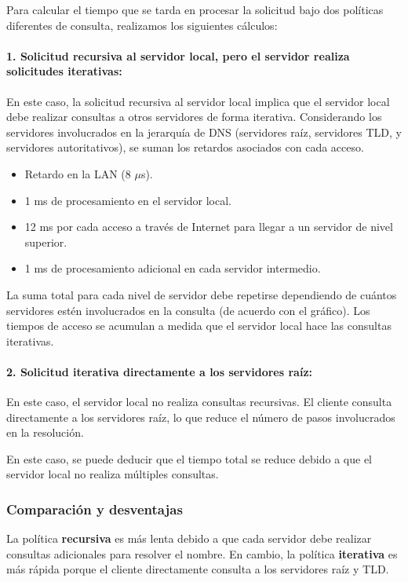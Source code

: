 \documentclass[a4paper,12pt]{article}
\begin{document}
Para calcular el tiempo que se tarda en procesar la solicitud bajo dos políticas diferentes de consulta, realizamos los siguientes cálculos:

\paragraph{1. Solicitud recursiva al servidor local, pero el servidor realiza solicitudes iterativas:}
En este caso, la solicitud recursiva al servidor local implica que el servidor local debe realizar consultas a otros servidores de forma iterativa. Considerando los servidores involucrados en la jerarquía de DNS (servidores raíz, servidores TLD, y servidores autoritativos), se suman los retardos asociados con cada acceso.

\begin{itemize}
    \item Retardo en la LAN (8 $\mu$s).
    \item 1 ms de procesamiento en el servidor local.
    \item 12 ms por cada acceso a través de Internet para llegar a un servidor de nivel superior.
    \item 1 ms de procesamiento adicional en cada servidor intermedio.
\end{itemize}

La suma total para cada nivel de servidor debe repetirse dependiendo de cuántos servidores estén involucrados en la consulta (de acuerdo con el gráfico). Los tiempos de acceso se acumulan a medida que el servidor local hace las consultas iterativas.

\paragraph{2. Solicitud iterativa directamente a los servidores raíz:}
En este caso, el servidor local no realiza consultas recursivas. El cliente consulta directamente a los servidores raíz, lo que reduce el número de pasos involucrados en la resolución.

En este caso, se puede deducir que el tiempo total se reduce debido a que el servidor local no realiza múltiples consultas.

\subsubsection{Comparación y desventajas}
La política \textbf{recursiva} es más lenta debido a que cada servidor debe realizar consultas adicionales para resolver el nombre. En cambio, la política \textbf{iterativa} es más rápida porque el cliente directamente consulta a los servidores raíz y TLD.
\end{document}
